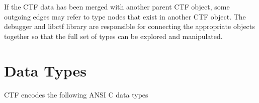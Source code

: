 If the CTF data has been merged with another parent CTF object, some
outgoing edges may refer to type nodes that exist in another CTF
object.  The debugger and libctf library are responsible for
connecting the appropriate objects together so that the full set of
types can be explored and manipulated.


\section{Data Types}
\label{sec:ctf-data-types}

CTF encodes the following ANSI C data types

